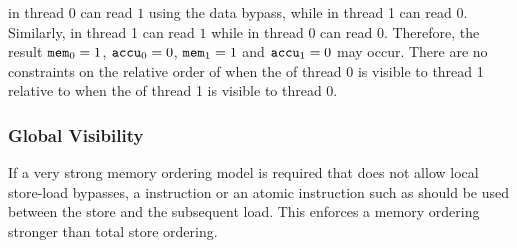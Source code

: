 \begin{table}[!hbt]
\noindent{}
\caption[Intra-Processor Forwarding is Allowed]{Intra-Processor Forwarding is Allowed \cite[Example 8]{ref:AMD}}
\label{tbl:litmus:amd:8}
\end{table}

\noindent
{} in thread 0 can read $1$ using the data bypass, while  in thread 1 can read $0$.
Similarly,  in thread 1 can read $1$ while  in thread 0 can read $0$.
Therefore, the result $\texttt{mem}_0 = 1$, $\texttt{accu}_0 = 0$, $\texttt{mem}_1 = 1$ and $\texttt{accu}_1 = 0$ may occur.
There are no constraints on the relative order of when the  of thread 0 is visible to thread 1 relative to when the  of thread 1 is visible to thread 0.

\newpage

\subsubsection*{Global Visibility}

If a very strong memory ordering model is required that does not allow local store-load bypasses, a  instruction or an atomic instruction such as  should be used between the store and the subsequent load.
This enforces a memory ordering stronger than total store ordering.

